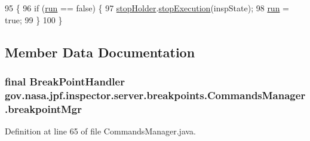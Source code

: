 \begin{DoxyCode}
95                                                  \{
96     \textcolor{keywordflow}{if} (\hyperlink{classgov_1_1nasa_1_1jpf_1_1inspector_1_1server_1_1breakpoints_1_1_commands_manager_a1d783904757a3257347e483773ec629a}{run} == \textcolor{keyword}{false}) \{
97       \hyperlink{classgov_1_1nasa_1_1jpf_1_1inspector_1_1server_1_1breakpoints_1_1_commands_manager_a3573f950aba2548e59f2c4f7c193b307}{stopHolder}.\hyperlink{classgov_1_1nasa_1_1jpf_1_1inspector_1_1server_1_1jpf_1_1_stop_holder_aae2d616c9e1b16fea4e9240b111b7ae3}{stopExecution}(inspState);
98       \hyperlink{classgov_1_1nasa_1_1jpf_1_1inspector_1_1server_1_1breakpoints_1_1_commands_manager_a1d783904757a3257347e483773ec629a}{run} = \textcolor{keyword}{true};
99     \}
100   \}
\end{DoxyCode}


\subsection{Member Data Documentation}
\subsubsection[{\texorpdfstring{breakpoint\+Mgr}{breakpointMgr}}]{\setlength{\rightskip}{0pt plus 5cm}final {\bf Break\+Point\+Handler} gov.\+nasa.\+jpf.\+inspector.\+server.\+breakpoints.\+Commands\+Manager.\+breakpoint\+Mgr\hspace{0.3cm}{\ttfamily [private]}}\hypertarget{classgov_1_1nasa_1_1jpf_1_1inspector_1_1server_1_1breakpoints_1_1_commands_manager_abdc258b16cc838a9d7431d9ddd04e424}{}\label{classgov_1_1nasa_1_1jpf_1_1inspector_1_1server_1_1breakpoints_1_1_commands_manager_abdc258b16cc838a9d7431d9ddd04e424}


Definition at line 65 of file Commands\+Manager.\+java.

